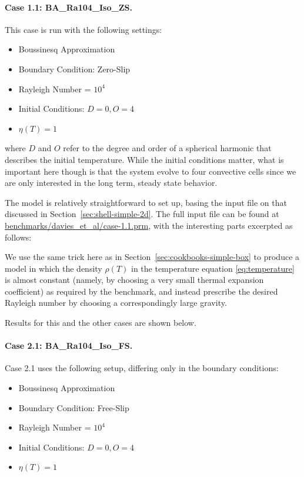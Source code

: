 \documentclass{article}
\begin{document}
\paragraph{Case 1.1: BA\_Ra104\_Iso\_ZS.}
\label{sec:davies-case11_BA}

This case is run with the following settings:
\begin{itemize}
\item Boussinesq Approximation
\item Boundary Condition: Zero-Slip
\item Rayleigh Number = $10^4$
\item Initial Conditions: $D = 0, O = 4$
\item $\eta(T) = 1$
\end{itemize}
where $D$ and $O$ refer to the degree and order of a spherical harmonic that describes the
initial temperature. While the initial conditions matter, what is important
here though is that the system evolve to four convective cells since we are
only interested in the long term, steady state behavior.

The model is relatively straightforward to set up, basing the input file on
that discussed in Section~\ref{sec:shell-simple-2d}. The full input file can
be found at \url{benchmarks/davies_et_al/case-1.1.prm}, with the interesting
parts excerpted as follows:



We use the same trick here as in Section~\ref{sec:cookbooks-simple-box} to
produce a model in which the density $\rho(T)$ in the temperature equation
\eqref{eq:temperature} is almost constant (namely, by choosing a very small
thermal expansion coefficient) as required by the benchmark, and instead
prescribe the desired Rayleigh number by choosing a correspondingly large
gravity.

Results for this and the other cases are shown below.


\paragraph{Case 2.1: BA\_Ra104\_Iso\_FS.}
\label{sec:davies-case21_BA}

Case 2.1 uses the following setup, differing only in the boundary conditions:
\begin{itemize}
\item Boussinesq Approximation
\item Boundary Condition: Free-Slip
\item Rayleigh Number = $10^4$
\item Initial Conditions: $D = 0, O = 4$
\item $\eta(T) = 1$
\end{itemize}
\end{document}
